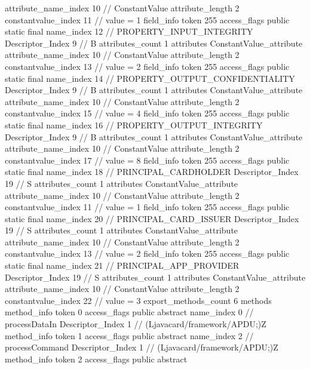 {{{{{{{					attribute_name_index	10		// ConstantValue
					attribute_length	2
					constantvalue_index	11		// value = 1
				}
				}
			}
			field_info {
				token	255
				access_flags	public static final
				name_index	12		// PROPERTY_INPUT_INTEGRITY
				Descriptor_Index	9		// B
				attributes_count	1
				attributes {
				ConstantValue_attribute {
					attribute_name_index	10		// ConstantValue
					attribute_length	2
					constantvalue_index	13		// value = 2
				}
				}
			}
			field_info {
				token	255
				access_flags	public static final
				name_index	14		// PROPERTY_OUTPUT_CONFIDENTIALITY
				Descriptor_Index	9		// B
				attributes_count	1
				attributes {
				ConstantValue_attribute {
					attribute_name_index	10		// ConstantValue
					attribute_length	2
					constantvalue_index	15		// value = 4
				}
				}
			}
			field_info {
				token	255
				access_flags	public static final
				name_index	16		// PROPERTY_OUTPUT_INTEGRITY
				Descriptor_Index	9		// B
				attributes_count	1
				attributes {
				ConstantValue_attribute {
					attribute_name_index	10		// ConstantValue
					attribute_length	2
					constantvalue_index	17		// value = 8
				}
				}
			}
			field_info {
				token	255
				access_flags	public static final
				name_index	18		// PRINCIPAL_CARDHOLDER
				Descriptor_Index	19		// S
				attributes_count	1
				attributes {
				ConstantValue_attribute {
					attribute_name_index	10		// ConstantValue
					attribute_length	2
					constantvalue_index	11		// value = 1
				}
				}
			}
			field_info {
				token	255
				access_flags	public static final
				name_index	20		// PRINCIPAL_CARD_ISSUER
				Descriptor_Index	19		// S
				attributes_count	1
				attributes {
				ConstantValue_attribute {
					attribute_name_index	10		// ConstantValue
					attribute_length	2
					constantvalue_index	13		// value = 2
				}
				}
			}
			field_info {
				token	255
				access_flags	public static final
				name_index	21		// PRINCIPAL_APP_PROVIDER
				Descriptor_Index	19		// S
				attributes_count	1
				attributes {
				ConstantValue_attribute {
					attribute_name_index	10		// ConstantValue
					attribute_length	2
					constantvalue_index	22		// value = 3
				}
				}
			}
			}
			export_methods_count	6
			methods {
				method_info {
					token	0
					access_flags	public abstract
					name_index	0		// processDataIn
					Descriptor_Index	1		// (Ljavacard/framework/APDU;)Z
				}
				method_info {
					token	1
					access_flags	public abstract
					name_index	2		// processCommand
					Descriptor_Index	1		// (Ljavacard/framework/APDU;)Z
				}
				method_info {
					token	2
					access_flags	public abstract
}}}}}
